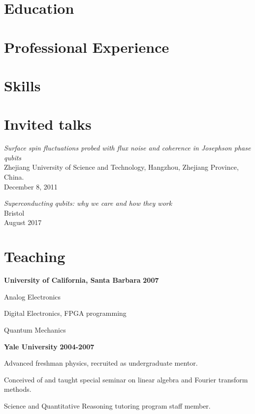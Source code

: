 \documentclass[margin=2cm,line]{res}
\begin{document}
\name{\huge \nameval}
\address{\addressval}
\address{\texttt{\emailval}}

\begin{resume}

\section{\sc Education}


\section{\sc Professional Experience}


\section{\sc Skills}


\section{\sc Invited talks}
\begin{list3}
\item \textit{Surface spin fluctuations probed with flux noise and coherence in Josephson phase qubits}\\
Zhejiang University of Science and Technology, Hangzhou, Zhejiang Province, China.\\ December 8, 2011
\item \textit{Superconducting qubits: why we care and how they work}\\
Bristol\\
August 2017
\end{list3}

\section{\sc Teaching}
{\bf University of California, Santa Barbara} \hfill{\bf 2007}
\begin{list4}
\item Analog Electronics
\item Digital Electronics, FPGA programming
\item Quantum Mechanics
\end{list4}
{\bf Yale University} \hfill{\bf 2004-2007}
\begin{list4}
\item Advanced freshman physics, recruited as undergraduate mentor.
\item Conceived of and taught special seminar on linear algebra and Fourier transform methods.
\item Science and Quantitative Reasoning tutoring program staff member.
\end{list4}


\end{resume}
\end{document}
